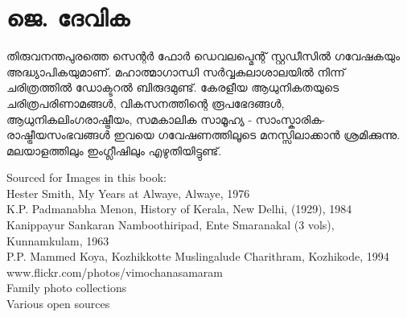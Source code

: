 \newpage

\section*{ജെ. ദേവിക}

തിരുവനന്തപുരത്തെ സെന്റർ ഫോർ ഡെവലപ്മെന്റ് സ്റ്റഡീസിൽ ഗവേഷകയും അദ്ധ്യാപികയുമാണ്. മഹാത്മാഗാന്ധി സർവ്വകലാശാലയിൽ നിന്ന് ചരിത്രത്തിൽ ഡോക്ടറൽ ബിരുദമുണ്ട്. കേരളീയ ആധുനികതയുടെ ചരിത്രപരിണാമങ്ങൾ, വികസനത്തിന്റെ രൂപഭേദങ്ങൾ, ആധുനികലിംഗരാഷ്ട്രീയം, സമകാലിക സാമൂഹ്യ - സാംസ്കാരിക-രാഷ്ട്രീയസംഭവങ്ങൾ ഇവയെ ഗവേഷണത്തിലൂടെ മനസ്സിലാക്കാൻ ശ്രമിക്കുന്നു. മലയാളത്തിലും ഇംഗ്ലീഷിലും എഴുതിയിട്ടുണ്ട്.


\begin{flushright}
Sourced for Images in this book:\\
Hester Smith, My Years at Alwaye, Alwaye, 1976\\
K.P. Padmanabha Menon, History of Kerala, New Delhi, (1929), 1984\\
Kanippayur Sankaran Namboothiripad, Ente Smaranakal (3 vols),
Kunnamkulam, 1963\\
P.P. Mammed Koya, Kozhikkotte Muslingalude Charithram,
Kozhikode, 1994\\
www.flickr.com/photos/vimochanasamaram\\
Family photo collections\\
Various open sources\\
\end{flushright}

